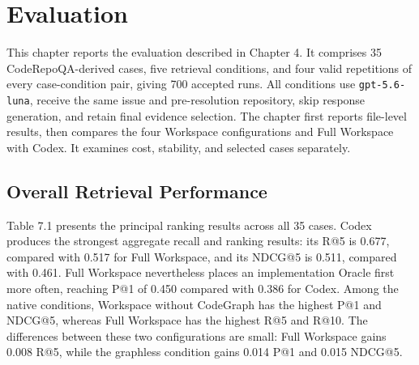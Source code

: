 \chapter{Evaluation}\label{ch:evaluation}

This chapter reports the evaluation described in Chapter 4. It comprises 35 CodeRepoQA-derived cases, five retrieval conditions, and four valid repetitions of every case-condition pair, giving 700 accepted runs. All conditions use \texttt{gpt-5.6-luna}, receive the same issue and pre-resolution repository, skip response generation, and retain final evidence selection. The chapter first reports file-level results, then compares the four Workspace configurations and Full Workspace with Codex. It examines cost, stability, and selected cases separately.

\section{Overall Retrieval Performance}\label{sec:overall-retrieval-performance}

Table 7.1 presents the principal ranking results across all 35 cases. Codex produces the strongest aggregate recall and ranking results: its R@5 is 0.677, compared with 0.517 for Full Workspace, and its NDCG@5 is 0.511, compared with 0.461. Full Workspace nevertheless places an implementation Oracle first more often, reaching P@1 of 0.450 compared with 0.386 for Codex. Among the native conditions, Workspace without CodeGraph has the highest P@1 and NDCG@5, whereas Full Workspace has the highest R@5 and R@10. The differences between these two configurations are small: Full Workspace gains 0.008 R@5, while the graphless condition gains 0.014 P@1 and 0.015 NDCG@5.

